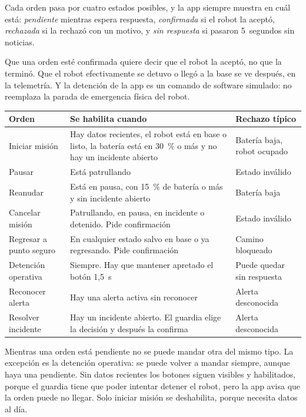 Cada orden pasa por cuatro estados posibles, y la app siempre muestra en cuál está: \textit{pendiente} mientras espera respuesta, \textit{confirmada} si el robot la aceptó, \textit{rechazada} si la rechazó con un motivo, y \textit{sin respuesta} si pasaron 5~segundos sin noticias.

\begin{nota}
Que una orden esté confirmada quiere decir que el robot la aceptó, no que la terminó. Que el robot efectivamente se detuvo o llegó a la base se ve después, en la telemetría. Y la detención de la app es un comando de software simulado: no reemplaza la parada de emergencia física del robot.
\end{nota}

\begin{table}[H]
\centering\small
\begin{tabularx}{\textwidth}{@{}l L l@{}}
\toprule
\textbf{Orden} & \textbf{Se habilita cuando} & \textbf{Rechazo típico} \\
\midrule
Iniciar misión & Hay datos recientes, el robot está en base o listo, la batería está en 30~\% o más y no hay un incidente abierto & Batería baja, robot ocupado \\
Pausar & Está patrullando & Estado inválido \\
Reanudar & Está en pausa, con 15~\% de batería o más y sin incidente abierto & Batería baja \\
Cancelar misión & Patrullando, en pausa, en incidente o detenido. Pide confirmación & Estado inválido \\
Regresar a punto seguro & En cualquier estado salvo en base o ya regresando. Pide confirmación & Camino bloqueado \\
Detención operativa & Siempre. Hay que mantener apretado el botón 1,5~s & Puede quedar sin respuesta \\
Reconocer alerta & Hay una alerta activa sin reconocer & Alerta desconocida \\
Resolver incidente & Hay un incidente abierto. El guardia elige la decisión y después la confirma & Alerta desconocida \\
\bottomrule
\end{tabularx}
\end{table}

Mientras una orden está pendiente no se puede mandar otra del mismo tipo. La excepción es la detención operativa: se puede volver a mandar siempre, aunque haya una pendiente. Sin datos recientes los botones siguen visibles y habilitados, porque el guardia tiene que poder intentar detener el robot, pero la app avisa que la orden puede no llegar. Solo iniciar misión se deshabilita, porque necesita datos al día.

